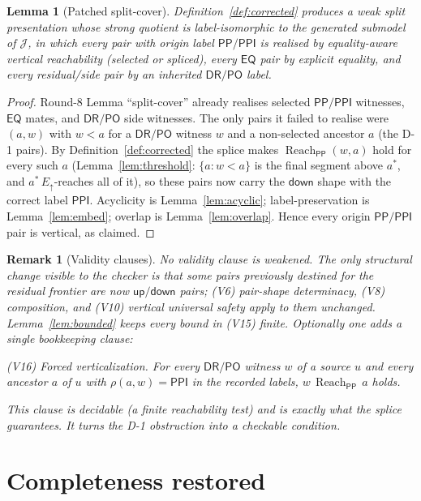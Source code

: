 \documentclass[11pt]{article}
\newtheorem{lemma}[theorem]{Lemma}
\newtheorem{remark}[theorem]{Remark}
\newcommand{\EQ}{\mathsf{EQ}}
\newcommand{\DR}{\mathsf{DR}}
\newcommand{\PO}{\mathsf{PO}}
\newcommand{\PP}{\mathsf{PP}}
\newcommand{\PPI}{\mathsf{PPI}}
\newcommand{\reach}{\operatorname{Reach}}
\newcommand{\Eup}{E_{\uparrow}}
\newcommand{\up}{\mathsf{up}}
\newcommand{\down}{\mathsf{down}}
\newcommand{\J}{\mathcal J}
\begin{document}
\begin{lemma}[Patched split-cover]\label{lem:patched-splitcover}
Definition~\ref{def:corrected} produces a weak split presentation whose strong
quotient is label-isomorphic to the generated submodel of $\J$, in which
\emph{every} pair with origin label $\PP/\PPI$ is realised by equality-aware
vertical reachability (selected or spliced), every $\EQ$ pair by explicit
equality, and every residual/side pair by an inherited $\DR/\PO$ label.
\end{lemma}

\begin{proof}
Round-8 Lemma ``split-cover'' already realises selected $\PP/\PPI$ witnesses,
$\EQ$ mates, and $\DR/\PO$ side witnesses.  The only pairs it failed to realise
were $(a,w)$ with $w<a$ for a $\DR/\PO$ witness $w$ and a non-selected ancestor
$a$ (the D-1 pairs).  By Definition~\ref{def:corrected} the splice makes
$\reach_\PP(w,a)$ hold for every such $a$ (Lemma~\ref{lem:threshold}:
$\{a:w<a\}$ is the final segment above $a^\ast$, and $a^\ast\,\Eup$-reaches all
of it), so these pairs now carry the $\down$ shape with the correct label
$\PPI$.  Acyclicity is Lemma~\ref{lem:acyclic}; label-preservation is
Lemma~\ref{lem:embed}; overlap is Lemma~\ref{lem:overlap}.  Hence every origin
$\PP/\PPI$ pair is vertical, as claimed.
\end{proof}

\begin{remark}[Validity clauses]
No validity clause is weakened.  The only structural change visible to the
checker is that some pairs previously destined for the residual frontier are now
$\up/\down$ pairs; (V6) pair-shape determinacy, (V8) composition, and (V10)
vertical universal safety apply to them unchanged.  Lemma~\ref{lem:bounded}
keeps every bound in (V15) finite.  Optionally one adds a single bookkeeping
clause:

\smallskip
\noindent(V16) \emph{Forced verticalization.}  For every $\DR/\PO$ witness $w$
of a source $u$ and every ancestor $a$ of $u$ with $\rho(a,w)=\PPI$ in the
recorded labels, $w\,\reach_\PP\,a$ holds.

\smallskip
\noindent This clause is decidable (a finite reachability test) and is exactly
what the splice guarantees.  It turns the D-1 obstruction into a checkable
condition.
\end{remark}

\section{Completeness restored}
\end{document}
